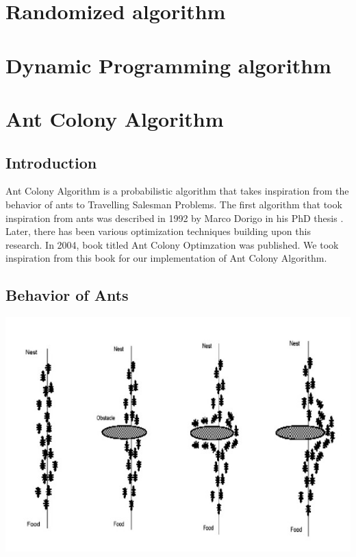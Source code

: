 \documentclass[11pt, english]{article}
\begin{document}
\section{Randomized algorithm}	
	
 \section{Dynamic Programming algorithm}	
	

\newpage
\section{Ant Colony Algorithm}

\subsection{Introduction}

Ant Colony Algorithm is a probabilistic algorithm that takes inspiration from the behavior of ants to Travelling Salesman Problems. The first algorithm that took inspiration from ants was described in 1992 by Marco Dorigo in his PhD thesis \cite{Dorigothesis}. Later, there has been various optimization techniques building upon this research. In 2004, book titled Ant Colony Optimzation was published. We took inspiration from this book for our implementation of Ant Colony Algorithm.

\subsection{Behavior of Ants}

\begin{center}
\includegraphics[scale=0.5]{antfood.jpg}
\end{center}
\end{document}
